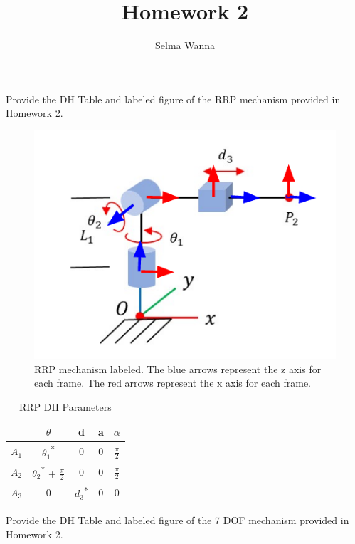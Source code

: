 \documentclass[12pt]{article}
\newenvironment{problem}[2][Problem]{\begin{trivlist}
\item[\hskip \labelsep {\bfseries #1}\hskip \labelsep {\bfseries #2.}]}{\end{trivlist}}
\begin{document}
 
 
\title{Homework 2}
\author{Selma Wanna}
\maketitle
 
\begin{problem}{1}
Provide the DH Table and labeled figure of the RRP mechanism provided in Homework 2.
\end{problem}
 
 \begin{figure}[H]
     \centering
     \includegraphics[width = 0.5\linewidth]{RRP.png}
     \caption{RRP mechanism labeled. The blue arrows represent the z axis for each frame. The red arrows represent the x axis for each frame.}
     \label{fig:rrp}
 \end{figure}


\begin{table}
\caption{RRP DH Parameters}
\begin{center}
\begin{tabular}{ c| c c c c }
 & $\theta$ & d & a & $\alpha$ \\ 
 \hline
 $A_1$ & $\theta_1$\textsuperscript{*} & 0 & 0 & $\frac{\pi}{2}$ \\  
 $A_2$ & $\theta_2$\textsuperscript{*} + $\frac{\pi}{2}$ & 0 & 0 & $\frac{\pi}{2}$ \\
 $A_3$ & 0 & $d_3$\textsuperscript{*} & 0 & 0
\end{tabular}
\end{center}
\end{table}





\pagebreak

\begin{problem}{2}
Provide the DH Table and labeled figure of the 7 DOF mechanism provided in Homework 2.
\end{problem}
\end{document}
